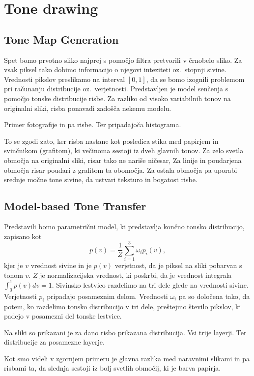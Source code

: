\section{Tone drawing}
%
\subsection{Tone Map Generation}
Spet bomo prvotno sliko najprej s pomočjo filtra pretvorili v črnobelo sliko. Za vsak piksel tako dobimo informacijo o njegovi inteziteti oz.\ stopnji sivine. Vrednosti pikslov preslikamo na interval $[0,1]$, da se bomo izognili problemom pri računanju distribucije oz.\ verjetnosti. Predstavljen je model senčenja s pomočjo tonske distribucije risbe. Za razliko od visoko variabilnih tonov na originalni sliki, risba ponavadi zadošča nekemu modelu.
%
\begin{primer}
Primer fotografije in pa risbe. Ter pripadajoča histograma.
\end{primer}
%
To se zgodi zato, ker risba nastane kot posledica stika med papirjem in svinčnikom (grafitom), ki večinoma sestoji iz dveh glavnih tonov. Za zelo svetla območja na originalni sliki, risar tako ne nariše ničesar, Za linije in poudarjena območja risar poudari z grafitom ta obomočja. Za ostala območja pa uporabi srednje močne tone sivine, da ustvari teksturo in bogatost risbe.
\subsection{Model-based Tone Transfer}
Predstavili bomo parametrični model, ki predstavlja končno tonsko distribucijo, zapisano kot
$$p(v) = \frac{1}{Z} \sum_{i=1}^{3} \omega_i p_i(v),$$
kjer je $v$ vrednost sivine in je $p(v)$ verjetnost, da je piksel na sliki pobarvan s tonom $v$. $Z$ je normalizacijska vrednost, ki poskrbi, da je vrednost integrala $\int_0^1 p(v) dv = 1$. Sivinsko lestvico razdelimo na tri dele glede na vrednosti sivine. Verjetnosti $p_i$ pripadajo posameznim delom. Vrednosti $\omega_i$ pa so določena tako, da potem, ko razdelimo tonsko distribucijo v tri dele, preštejmo število pikslov, ki padejo v posamezni del tonske lestvice.
%
\begin{primer}
Na sliki so prikazani je za dano risbo prikazana distribucija. Vsi trije layerji. Ter distribucije za posamezne layerje.
\end{primer}
%
Kot smo videli v zgornjem primeru je glavna razlika med naravnimi slikami in pa risbami ta, da slednja sestoji iz bolj svetlih območij, ki je barva papirja.

